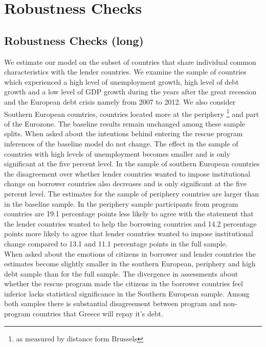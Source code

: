 \section{Robustness Checks}
\subsection{Robustness Checks (long) }
We estimate our model on the subset of countries that share individual common characteristics with the lender countries. We examine the sample of countries which experienced a high level of unemployment growth, high level of debt growth and a low level of GDP growth during the years after the great recession and the European debt crisis namely from 2007 to 2012. We also consider Southern European countries, countries located more at the periphery \footnote{as measured by distance form Brussels} and part of the Eurozone. The baseline results remain unchanged among these sample splits. When asked about the intentions behind entering the rescue program inferences of the baseline model do not change. The effect in the sample of countries with high levels of unemployment becomes smaller and is only significant at the five percent level. In the sample of southern European countries the disagreement over whether lender countries wanted to impose institutional change on borrower countries also decreases and is only significant at the five percent level. The estimates for the sample of periphery countries are larger than in the baseline sample. In the periphery sample participants from program countries are 19.1 percentage points less likely to agree with the statement that the lender countries wanted to help the borrowing countries and 14.2 percentage points more likely to agree that lender countries wanted to impose institutional change compared to 13.1 and 11.1 percentage points in the full sample.\\
When asked about the emotions of citizens in borrower and lender countries the estimates become slightly smaller in the southern European, periphery and high debt sample than for the full sample. The divergence in assessments about whether the rescue program made the citizens in the borrower countries feel inferior lacks statistical significance in the Southern European sample. Among both samples there is substantial disagreement between program and non-program countries that Greece will repay it's debt. 
\\
